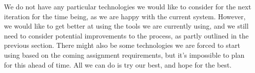 \documentclass{article}
\begin{document}
We do not have any particular technologies we would like to consider for the next iteration for the time being, as we are happy with the current system. However, we would like to get better at using the tools we are currently using, and we still need to consider potential improvements to the process, as partly outlined in the previous section. There might also be some technologies we are forced to start using based on the coming assignment requirements, but it's impossible to plan for this ahead of time. All we can do is try our best, and hope for the best.
\end{document}
